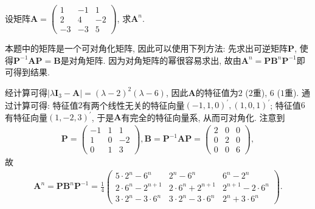\documentclass[../../main.tex]{subfiles}%
\begin{document}
\begin{example}
设矩阵\(\boldsymbol{A}=\begin{pmatrix}
1&-1&1\\
2&4&-2\\
-3&-3&5
\end{pmatrix}\), 求\(\boldsymbol{A}^{n}\).
\end{example}
\begin{note}
本题中的矩阵是一个可对角化矩阵, 因此可以使用下列方法: 先求出可逆矩阵\(\boldsymbol{P}\), 使得\(\boldsymbol{P}^{-1}\boldsymbol{AP}=\boldsymbol{B}\)是对角矩阵. 因为对角矩阵的幂很容易求出, 故由\(\boldsymbol{A}^{n}=\boldsymbol{P}\boldsymbol{B}^{n}\boldsymbol{P}^{-1}\)即可得到结果.
\end{note}
\begin{solution}    
经计算可得\(\vert\lambda\boldsymbol{I}_{3}-\boldsymbol{A}\vert = (\lambda - 2)^{2}(\lambda - 6)\), 因此\(\boldsymbol{A}\)的特征值为\(2\) (\(2\)重), \(6\) (\(1\)重). 通过计算可得: 特征值\(2\)有两个线性无关的特征向量\((-1,1,0)^{\prime},(1,0,1)^{\prime}\); 特征值\(6\)有特征向量\((1,-2,3)^{\prime}\), 于是\(\boldsymbol{A}\)有完全的特征向量系, 从而可对角化. 注意到
\begin{align*}
\boldsymbol{P}=\begin{pmatrix}
-1&1&1\\
1&0&-2\\
0&1&3
\end{pmatrix}, \boldsymbol{B}=\boldsymbol{P}^{-1}\boldsymbol{AP}=\begin{pmatrix}
2&0&0\\
0&2&0\\
0&0&6
\end{pmatrix},
\end{align*}
故
\begin{align*}
\boldsymbol{A}^{n}=\boldsymbol{P}\boldsymbol{B}^{n}\boldsymbol{P}^{-1}=\frac{1}{4}\begin{pmatrix}
5\cdot 2^{n}-6^{n}&2^{n}-6^{n}&6^{n}-2^{n}\\
2\cdot 6^{n}-2^{n + 1}&2\cdot 6^{n}+2^{n + 1}&2^{n + 1}-2\cdot 6^{n}\\
3\cdot 2^{n}-3\cdot 6^{n}&3\cdot 2^{n}-3\cdot 6^{n}&2^{n}+3\cdot 6^{n}
\end{pmatrix}.
\end{align*} 

\end{solution}
\end{document}
